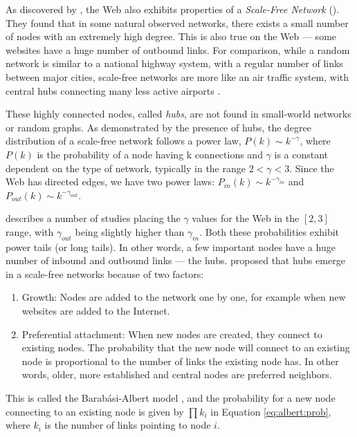 As discovered by \cite{Albert1999}, the Web also exhibits properties of a \emph{Scale-Free Network} (). 
They found that in some natural observed networks, there exists a small number of nodes with an extremely high degree. 
This is also true on the Web --- some websites have a huge number of outbound links. 
For comparison, while a random network is similar to a national highway system, with a regular number of links between major cities, scale-free networks are more like an air traffic system, with central hubs connecting many less active airports \citep[p71]{Barabasi2003}.

These highly connected nodes, called \emph{hubs}, are not found in small-world networks or random graphs. As demonstrated by the presence of hubs, the degree distribution of a scale-free network follows a power law, 
$P(k) \sim k^{-\gamma}$, 
where $P(k)$ is the probability of a node having k connections and $\gamma$ is a constant dependent on the type of network, typically in the range $2 < \gamma < 3$. 
Since the Web has directed edges,
we have two power laws:
$P_{in}(k) \sim k^{-\gamma_{in}}$ and 
$P_{out}(k) \sim k^{-\gamma_{out}}$.

\cite{Albert1999} describes a number of studies placing the $\gamma$ values for the Web in the $[2,3]$ range, 
with $\gamma_{out}$ being slightly higher than $\gamma_{in}$. 
Both these probabilities exhibit power tails (or long tails). 
In other words, a few important nodes have a huge number of inbound and outbound links --- the hubs. 
\citet[p86]{Barabasi2003} proposed that hubs emerge in a scale-free networks because of two factors:

\begin{enumerate}
  \item Growth: Nodes are added to the network one by one, for example when new websites are added to the Internet.
  \item Preferential attachment: When new nodes are created, they connect to existing nodes. The probability that the new node will connect to an existing node is proportional to the number of links the existing node has. In other words, older, more established and central nodes are preferred neighbors.
\end{enumerate}

This is called the Barab\'{a}si-Albert model \citep{Albert1999}, 
and the probability for a new node connecting to an existing node is given by $\prod k_i$ in Equation \ref{eq:albert:prob}, 
where $k_i$ is the number of links pointing to node $i$. 

